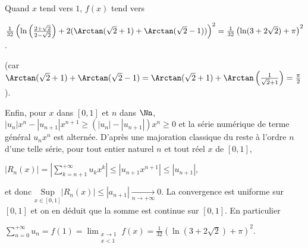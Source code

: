 {{Quand $x$ tend vers $1$, $f(x)$ tend vers 

\begin{center}
$\frac{1}{32}
\left(\ln\left(\frac{2+\sqrt{2}}{2-\sqrt{2}}\right)+ 2 (\Arctan (\sqrt{2}+1)+\Arctan(\sqrt{2}-1))\right)^2=  \frac{1}{32}\left(\ln(3+2\sqrt{2}) +\pi\right)^2$.
\end{center}

(car $\Arctan (\sqrt{2}+1)+\Arctan(\sqrt{2}-1)=\Arctan (\sqrt{2}+1)+\Arctan\left(\frac{1}{\sqrt{2}+1}\right)=\frac{\pi}{2}$).

Enfin, pour $x$ dans $[0,1]$ et $n$ dans $\Nn$, $|u_n|x^n - |u_{n+1}|x^{n+1}\geqslant(|u_n| - |u_{n+1}|)x^n\geqslant 0$ et la série numérique de terme général $u_nx^n$ est alternée. D'après une majoration classique du reste à l'ordre $n$ d'une telle série, pour tout entier naturel $n$ et tout réel $x$ de $[0,1]$,

\begin{center}
$|R_n(x)|=\left|\sum_{k=n+1}^{+\infty}u_kx^k\right|\leqslant\left|u_{n+1}x^{n+1}\right|\leqslant |u_{n+1}|$,
\end{center}

et donc $\underset{x\in[0,1]}{\text{Sup}}|R_n(x)|\leqslant|a_{n+1}|\underset{n\rightarrow+\infty}{\rightarrow}0$. La convergence est uniforme sur $[0,1]$ et on en déduit que la somme est continue sur $[0,1]$. En particulier 

\begin{center}
$\sum_{n=0}^{+\infty}u_n=f(1)=\displaystyle\lim_{\substack{x\rightarrow1\\ x<1}}f(x)=\frac{1}{32}\left(\ln(3+2\sqrt{2}) +\pi\right)^2$.
\end{center}

\begin{center}
\end{center}}
}